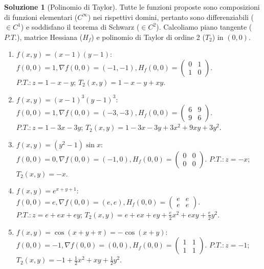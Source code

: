 \documentclass[12pt,a4paper]{article}
\theoremstyle{definition}
\newtheorem{sol}{Soluzione}
\begin{document}
\begin{sol}[Polinomio di Taylor]
    Tutte le funzioni proposte sono composizioni di funzioni elementari ($C^\infty$) nei rispettivi domini, pertanto sono differenziabili ($\in C^1$) e soddisfano il teorema di Schwarz ($\in C^2$).
    Calcoliamo piano tangente ($P.T.$), matrice Hessiana ($H_f$) e polinomio di Taylor di ordine 2 ($T_2$) in $(0,0)$.

    \begin{enumerate}
        \item $f(x,y) = (x-1)(y-1)$:
              $f(0,0) = 1, \nabla f(0,0) = (-1, -1), H_f(0,0) = \begin{pmatrix} 0 & 1 \\ 1 & 0 \end{pmatrix}$.
              $P.T.: z = 1-x-y$; $T_2(x,y) = 1-x-y+xy$.

        \item $f(x,y) = (x-1)^3(y-1)^3$:
              $f(0,0) = 1, \nabla f(0,0) = (-3, -3), H_f(0,0) = \begin{pmatrix} 6 & 9 \\ 9 & 6 \end{pmatrix}$.
              $P.T.: z = 1-3x-3y$; $T_2(x,y) = 1-3x-3y+3x^2+9xy+3y^2$.

        \item $f(x,y) = (y^2-1) \sin x$:
              $f(0,0) = 0, \nabla f(0,0) = (-1, 0), H_f(0,0) = \begin{pmatrix} 0 & 0 \\ 0 & 0 \end{pmatrix}$.
              $P.T.: z = -x$; $T_2(x,y) = -x$.

        \item $f(x,y) = e^{x+y+1}$:
              $f(0,0) = e, \nabla f(0,0) = (e, e), H_f(0,0) = \begin{pmatrix} e & e \\ e & e \end{pmatrix}$.
              $P.T.: z = e+ex+ey$; $T_2(x,y) = e+ex+ey+\frac{e}{2}x^2+exy+\frac{e}{2}y^2$.

        \item $f(x,y) = \cos(x+y+\pi) = -\cos(x+y)$:
              $f(0,0) = -1, \nabla f(0,0) = (0, 0), H_f(0,0) = \begin{pmatrix} 1 & 1 \\ 1 & 1 \end{pmatrix}$.
              $P.T.: z = -1$; $T_2(x,y) = -1+\frac{1}{2}x^2+xy+\frac{1}{2}y^2$.
    \end{enumerate}
\end{sol}
\end{document}
